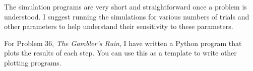 The simulation programs are very short and straightforward once a problem is understood. I suggest running the simulations for various numbers of trials and other parameters to help understand their sensitivity to these parameters.

For Problem 36, \textit{The Gambler's Ruin}, I have written a Python program that plots the results of each step. You can use this as a template to write other plotting programs.

